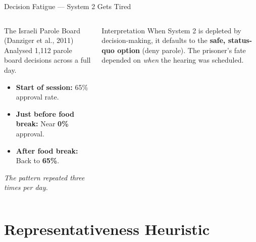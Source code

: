 \documentclass[aspectratio=169]{beamer}
\begin{document}
\begin{frame}{Decision Fatigue --- System 2 Gets Tired}
\begin{columns}
\begin{exampleblock}{The Israeli Parole Board (Danziger et al., 2011)}
Analysed 1,112 parole board decisions across a full day.
\begin{itemize}
  \item \textbf{Start of session:} 65\% approval rate.
  \item \textbf{Just before food break:} Near \textbf{0\%} approval.
  \item \textbf{After food break:} Back to \textbf{65\%}.
\end{itemize}
\textit{The pattern repeated three times per day.}
\end{exampleblock}
\begin{exampleblock}{Interpretation}
When System 2 is depleted by decision-making, it defaults to the \textbf{safe, status-quo option} (deny parole). The prisoner's fate depended on \textit{when} the hearing was scheduled.
\end{exampleblock}
\end{columns}
\end{frame}

\section{Representativeness Heuristic}
\end{document}
